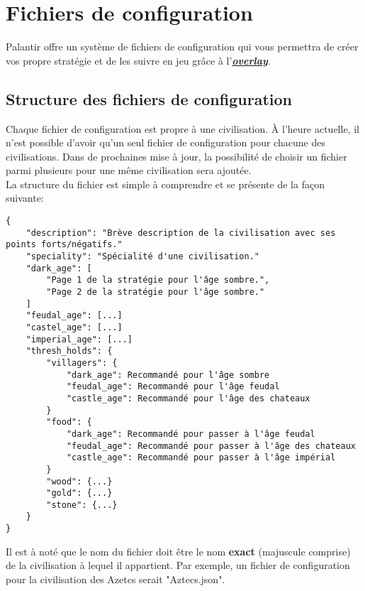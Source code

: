
\label{sec:configfiles}
\section{Fichiers de configuration}

Palantir offre un système de fichiers de configuration qui vous permettra de créer vos propre stratégie et de les suivre en jeu grâce à l'\hyperref[sec:overlays]{\textbf{\textit{overlay}}}.

\subsection{Structure des fichiers de configuration}
Chaque fichier de configuration est propre à une civilisation. À l'heure actuelle, il n'est possible d'avoir qu'un seul fichier de configuration pour chacune des civilisations. Dans de prochaines mise à jour, la possibilité de choisir un fichier parmi plusieurs pour une même civilisation sera ajoutée.
\\
La structure du fichier est simple à comprendre et se présente de la façon suivante:
\begin{verbatim}
{
    "description": "Brève description de la civilisation avec ses points forts/négatifs."
    "speciality": "Spécialité d'une civilisation."
    "dark_age": [
        "Page 1 de la stratégie pour l'âge sombre.",
        "Page 2 de la stratégie pour l'âge sombre."
    ]
    "feudal_age": [...]
    "castel_age": [...]
    "imperial_age": [...]
    "thresh_holds": {
        "villagers": {
            "dark_age": Recommandé pour l'âge sombre
            "feudal_age": Recommandé pour l'âge feudal
            "castle_age": Recommandé pour l'âge des chateaux
        }
        "food": {
            "dark_age": Recommandé pour passer à l'âge feudal
            "feudal_age": Recommandé pour passer à l'âge des chateaux
            "castle_age": Recommandé pour passer à l'âge impérial
        }
        "wood": {...}
        "gold": {...}
        "stone": {...}
    }
}
\end{verbatim}

Il est à noté que le nom du fichier doit être le nom \textbf{exact} (majuscule comprise) de la civilisation à lequel il appartient. Par exemple, un fichier de configuration pour la civilisation des Azetcs serait "Aztecs.json".